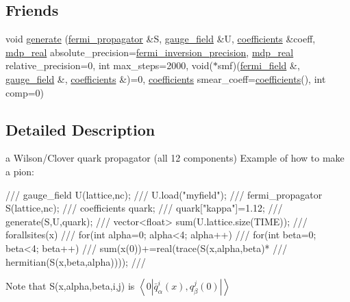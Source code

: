 \subsection*{Friends}
\begin{DoxyCompactItemize}
\item 
void \hyperlink{classfermi__propagator_a0b3730ff1e1058f1e13b537d429c7333}{generate} (\hyperlink{classfermi__propagator}{fermi\_\-propagator} \&S, \hyperlink{classgauge__field}{gauge\_\-field} \&U, \hyperlink{classcoefficients}{coefficients} \&coeff, \hyperlink{mdp__global__vars_8h_a049e4c1d4e74d644878a42f9909463e4}{mdp\_\-real} absolute\_\-precision=\hyperlink{fermiqcd__default__parameters_8h_ab11c95dc923c6bfd349bd67af277d59d}{fermi\_\-inversion\_\-precision}, \hyperlink{mdp__global__vars_8h_a049e4c1d4e74d644878a42f9909463e4}{mdp\_\-real} relative\_\-precision=0, int max\_\-steps=2000, void($\ast$smf)(\hyperlink{classfermi__field}{fermi\_\-field} \&, \hyperlink{classgauge__field}{gauge\_\-field} \&, \hyperlink{classcoefficients}{coefficients} \&)=0, \hyperlink{classcoefficients}{coefficients} smear\_\-coeff=\hyperlink{classcoefficients}{coefficients}(), int comp=0)
\end{DoxyCompactItemize}


\subsection{Detailed Description}
a Wilson/Clover quark propagator (all 12 components) Example of how to make a pion: \begin{DoxyVerb}
/// gauge_field U(lattice,nc);
/// U.load("myfield");
/// fermi_propagator S(lattice,nc);
/// coefficients quark;
/// quark["kappa"]=1.12;
/// generate(S,U,quark);
/// vector<float> sum(U.lattice.size(TIME));
/// forallsites(x) 
///   for(int alpha=0; alpha<4; alpha++)
///     for(int beta=0; beta<4; beta++)
///        sum(x(0))+=real(trace(S(x,alpha,beta)*
///                   hermitian(S(x,beta,alpha))));
/// \end{DoxyVerb}
 Note that S(x,alpha,beta,i,j) is $ \left<0|\bar q^i_\alpha(x), q^j_\beta(0)|\right> $ 

